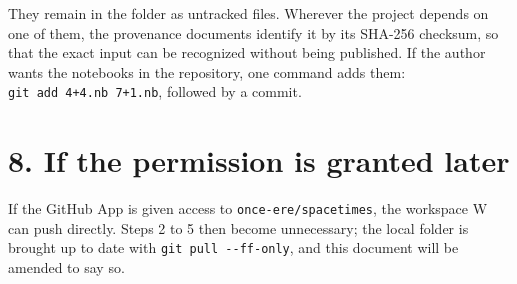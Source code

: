 \documentclass[
  10pt,
]{article}
\begin{document}
They remain in the folder as untracked files. Wherever the project
depends on one of them, the provenance documents identify it by its
SHA-256 checksum, so that the exact input can be recognized without
being published. If the author wants the notebooks in the repository,
one command adds them: \texttt{git\ add\ 4+4.nb\ 7+1.nb}, followed by a
commit.

\hypertarget{if-the-permission-is-granted-later}{%
\section{8. If the permission is granted
later}\label{if-the-permission-is-granted-later}}

If the GitHub App is given access to \texttt{once-ere/spacetimes}, the
workspace W can push directly. Steps 2 to 5 then become unnecessary; the
local folder is brought up to date with \texttt{git\ pull\ -\/-ff-only},
and this document will be amended to say so.
\end{document}
